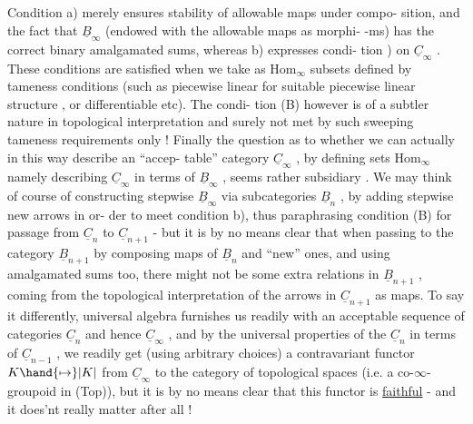 Condition a) merely ensures stability of allowable maps under compo-%
sition, and the fact that $\underline{B}_\infty$ (endowed with the allowable maps as morphi-%
-ms) has the correct binary amalgamated sums, whereas b) expresses condi-%
tion ) on $\underline{C}_\infty$ . These conditions are satisfied when we take as $\mathrm{Hom}_\infty$
subsets defined by tameness conditions (such as piecewise linear for
suitable piecewise linear structure , or differentiable etc). The condi-%
tion (B) however is of a subtler nature in  topological interpretation\hand{,}
and surely not met by such sweeping tameness requirements only ! Finally
the question as to whether we can actually in this way describe an ``accep-%
table'' category $\underline{C}_\infty$ , by defining sets $\mathrm{Hom}_\infty$ namely describing $\underline{C}_\infty$ in terms
of $\underline{B}_\infty$ , seems rather subsidiary . We may think of course of constructing
stepwise $\underline{B}_\infty$ via subcategories $\underline{B}_n$ , by adding stepwise new arrows in or-%
der to meet condition b), thus paraphrasing condition (B) for passage 
from $\underline{C}_n$ to $\underline{C}_{n+1}$ - but it is by no means clear that when passing to the
category $\underline{B}_{n+1}$ by composing  maps of $\underline{B}_n$ and ``new'' ones, and
using amalgamated sums too, there might not be some  extra relations
 in $\underline{B}_{n+1}$ , coming from the topological interpretation of the arrows
in $\underline{C}_{n+1}$ as maps. To say it differently, universal algebra furnishes us
readily with an acceptable sequence of categories $\underline{C}_n$ and hence $\underline{C}_\infty$ , and
by the universal properties of the $\underline{C}_n$ in terms of $\underline{C}_{n-1}$ , we readily get
(using arbitrary choices) a contravariant functor $K \hand{\mapsto} |K|$ from $\underline{C}_\infty$ to
the category of topological spaces (i.e. a co-$\infty$-groupoid in (Top)), but
it is by no means clear that this functor is \uline{faithful} - and it does'nt
really matter after all !

